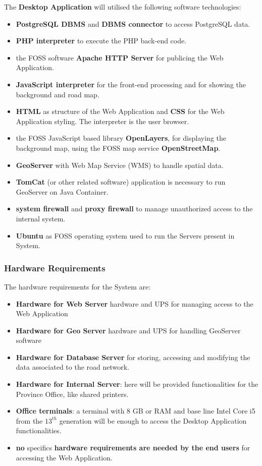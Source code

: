 The \textbf{Desktop Application} will utilised the following software technologies:
\begin{itemize}
    \item \textbf{PostgreSQL DBMS} and \textbf{DBMS connector} to access PostgreSQL data.
    \item \textbf{PHP interpreter} to execute the PHP back-end code.
    \item the FOSS software \textbf{Apache HTTP Server} for publicing the Web Application. 
    \item \textbf{JavaScript interpreter} for the front-end processing and for showing the background and road map.
    \item \textbf{HTML} as structure of the Web Application and \textbf{CSS} for the Web Application styling. The interpreter is the user browser.
    \item the FOSS JavaScript based library \textbf{OpenLayers}, for displaying the background map, using the FOSS map service \textbf{OpenStreetMap}.
    \item \textbf{GeoServer} with Web Map Service (WMS) to handle spatial data.
    \item \textbf{TomCat} (or other related software) application is necessary to run GeoServer on Java Container.
    \item \textbf{system firewall} and \textbf{proxy firewall} to manage unauthorized access to the internal system.
    \item \textbf{Ubuntu} as FOSS operating system used to run the Servers present in System. 
\end{itemize}

\subsubsection{Hardware Requirements}
The hardware requirements for the System are:
\begin{itemize}
    \item \textbf{Hardware for Web Server} hardware and UPS for managing access to the Web Application
     \item \textbf{Hardware for Geo Server} hardware and UPS for handling GeoServer software
     \item \textbf{Hardware for Database Server} for storing, accessing and modifying the data associated to the road network.
     \item \textbf{Hardware for Internal Server}: here will be provided functionalities for the Province Office, like shared printers.
     \item \textbf{Office terminals}: a terminal with 8 GB or RAM and base line Intel Core i5 from the $13^{th}$ generation will be enough to access the Desktop Application functionalities.
     \item \textbf{no} specifics \textbf{hardware requirements are needed by the end users} for accessing the Web Application.
\end{itemize}

